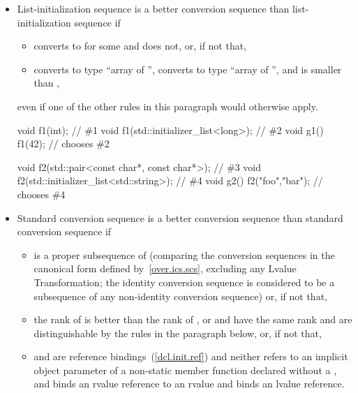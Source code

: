 \begin{itemize}
\item
List-initialization sequence  is a better conversion sequence than
list-initialization sequence  if

\begin{itemize}
\item
{} converts to  for some  and
 does not, or, if not that,

\item
{} converts to type ``array of  '',  converts to
type ``array of  '', and  is smaller than ,
\end{itemize}
even if one of the other rules in this paragraph would otherwise apply.
\begin{example}
\begin{codeblock}
  void f1(int);                                 // \#1
  void f1(std::initializer_list<long>);         // \#2
  void g1() { f1({42}); }                       // chooses \#2

  void f2(std::pair<const char*, const char*>); // \#3
  void f2(std::initializer_list<std::string>);  // \#4
  void g2() { f2({"foo","bar"}); }              // chooses \#4
\end{codeblock}
\end{example}

\item
Standard conversion sequence
is a better conversion
sequence than standard conversion sequence
if

\begin{itemize}
\item
{}%
is a proper subsequence of
(comparing the conversion sequences in the canonical form defined
by~\ref{over.ics.scs}, excluding any Lvalue Transformation;
the identity conversion sequence is considered to be a
subsequence of any non-identity conversion sequence)
or, if not that,
\item
the rank of
is better than the rank of
,
or
and
have the same rank and are distinguishable by the rules
in the paragraph below,
or, if not that,

\item {} and  are reference bindings~(\ref{dcl.init.ref}) and
neither refers to an implicit object parameter of a non-static member function
declared without a ,
and  binds an rvalue reference to an
rvalue and  binds an lvalue reference.


\end{itemize}
\end{itemize}
